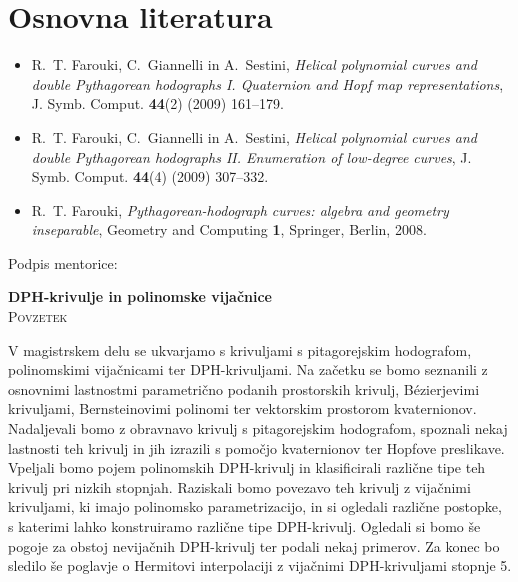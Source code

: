 \documentclass[12pt,a4paper,twoside]{article}
\newcommand{\naslovdela}{DPH-krivulje in polinomske vijačnice}
\theoremstyle{definition} %
\theoremstyle{plain} %
\theoremstyle{primerstyle}
\numberwithin{equation}{section}  %
\begin{document}
\section*{Osnovna literatura}
\begin{itemize}
  \item[\cite{DPHclanek1}] R.~T. Farouki, C.~Giannelli in A.~Sestini, \emph{{Helical polynomial curves and
  double Pythagorean hodographs I. Quaternion and Hopf map representations}}, J. Symb. Comput. \textbf{44}(2) (2009) 161--179.
  \item[\cite{DPHclanek2}] R.~T. Farouki, C.~Giannelli in A.~Sestini, \emph{{Helical polynomial curves and
  double Pythagorean hodographs II. Enumeration of low-degree curves}}, J. Symb. Comput. \textbf{44}(4) (2009) 307--332.
  \item[\cite{farouki2008pythagorean}] R.~T. Farouki, \emph{Pythagorean-hodograph curves: algebra and geometry inseparable}, Geometry and Computing \textbf{1}, Springer, Berlin, 2008.
\end{itemize}

\vspace{2cm}
\hspace*{\fill} Podpis mentorice: \phantom{prostor za podpis}


\cleardoublepage
{}

\begin{center}
\textbf{\naslovdela} \\[3mm]
\textsc{Povzetek} \\[2mm]
\end{center}

V magistrskem delu se ukvarjamo s krivuljami s pitagorejskim hodografom, polinomskimi vijačnicami ter DPH-krivuljami. Na začetku se bomo seznanili z osnovnimi lastnostmi parametrično podanih prostorskih krivulj, Bézierjevimi krivuljami, Bernsteinovimi polinomi ter vektorskim prostorom kvaternionov. Nadaljevali bomo z obravnavo krivulj s pitagorejskim hodografom, spoznali nekaj lastnosti teh krivulj in jih izrazili s pomočjo kvaternionov ter Hopfove preslikave. Vpeljali bomo pojem polinomskih DPH-krivulj in klasificirali različne tipe teh krivulj pri nizkih stopnjah. Raziskali bomo povezavo teh krivulj z vijačnimi krivuljami, ki imajo polinomsko parametrizacijo, in si ogledali različne postopke, s katerimi lahko konstruiramo različne tipe DPH-krivulj. Ogledali si bomo še pogoje za obstoj nevijačnih DPH-krivulj ter podali nekaj primerov. Za konec bo sledilo še poglavje o Hermitovi interpolaciji z vijačnimi DPH-krivuljami stopnje 5.
\end{document}
